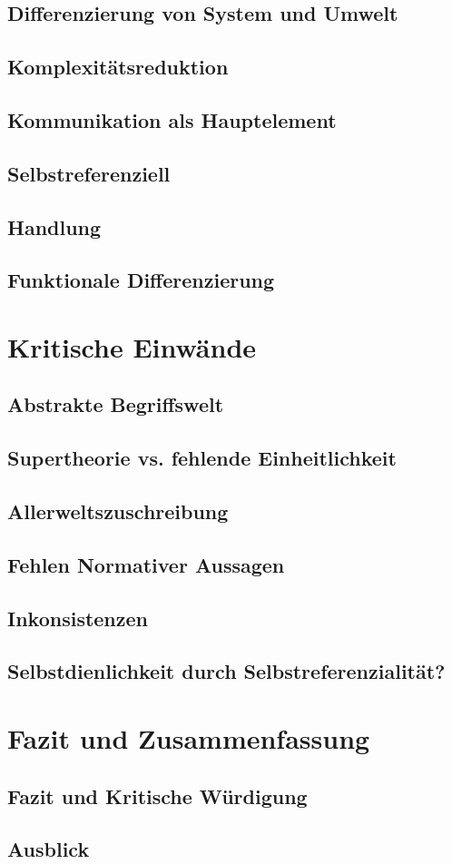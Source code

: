 \documentclass[a4paper,12pt]{article}
\begin{document}
\subsection{Differenzierung von System und Umwelt}
\subsection{Komplexitätsreduktion}
\subsection{Kommunikation als Hauptelement}
\subsection{Selbstreferenziell}
\subsection{Handlung}
\subsection{Funktionale Differenzierung}

\section{Kritische Einwände}
\subsection{Abstrakte Begriffswelt}
\subsection{Supertheorie vs. fehlende Einheitlichkeit}
\subsection{Allerweltszuschreibung}
\subsection{Fehlen Normativer Aussagen}
\subsection{Inkonsistenzen}
\subsection{Selbstdienlichkeit durch Selbstreferenzialität?}
\newpage

\section{Fazit und Zusammenfassung}
\subsection{Fazit und Kritische Würdigung}
\subsection{Ausblick}


\newpage




\printbibliography
% 
% 
\end{document}
